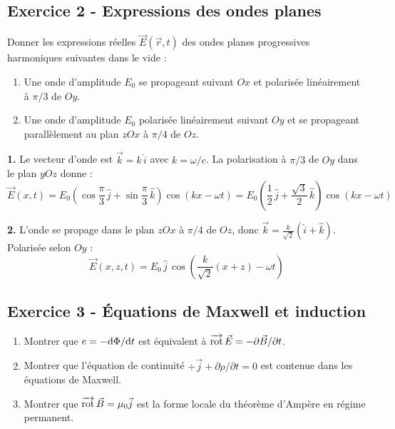 \documentclass[12pt,a4paper]{article}
\begin{document}
\subsection*{Exercice 2 - Expressions des ondes planes \niveau{\moyen}}

\begin{boiteexercice}
Donner les expressions réelles $\vec{E}(\vec{r},t)$ des ondes planes progressives harmoniques suivantes dans le vide :
\begin{enumerate}
  \item Une onde d'amplitude $E_0$ se propageant suivant $Ox$ et polarisée linéairement à $\pi/3$ de $Oy$.
  \item Une onde d'amplitude $E_0$ polarisée linéairement suivant $Oy$ et se propageant parallèlement au plan $zOx$ à $\pi/4$ de $Oz$.
\end{enumerate}
\end{boiteexercice}

\begin{boitecorrige}
\textbf{1.} Le vecteur d'onde est $\vec{k} = k\,\hat{i}$ avec $k = \omega/c$. La polarisation à $\pi/3$ de $Oy$ dans le plan $yOz$ donne :
\[
\boxed{\vec{E}(x,t) = E_0\left(\cos\frac{\pi}{3}\,\hat{j} + \sin\frac{\pi}{3}\,\hat{k}\right)\cos(kx-\omega t) = E_0\left(\frac{1}{2}\,\hat{j} + \frac{\sqrt{3}}{2}\,\hat{k}\right)\cos(kx-\omega t)}
\]

\textbf{2.} L'onde se propage dans le plan $zOx$ à $\pi/4$ de $Oz$, donc $\vec{k} = \frac{k}{\sqrt{2}}(\hat{i}+\hat{k})$. Polarisée selon $Oy$ :
\[
\boxed{\vec{E}(x,z,t) = E_0\,\hat{j}\,\cos\!\left(\frac{k}{\sqrt{2}}(x+z) - \omega t\right)}
\]
\end{boitecorrige}

\subsection*{Exercice 3 - Équations de Maxwell et induction \niveau{\difficile}}

\begin{boiteexercice}
\begin{enumerate}
  \item Montrer que $e = -\mathrm{d}\Phi/\mathrm{d} t$ est équivalent à $\overrightarrow{\mathrm{rot}}\,\vec{E} = -\partial\vec{B}/\partial t$.
  \item Montrer que l'équation de continuité $\div\vec{j} + \partial\rho/\partial t = 0$ est contenue dans les équations de Maxwell.
  \item Montrer que $\overrightarrow{\mathrm{rot}}\,\vec{B} = \mu_0\vec{j}$ est la forme locale du théorème d'Ampère en régime permanent.
\end{enumerate}
\end{boiteexercice}
\end{document}
